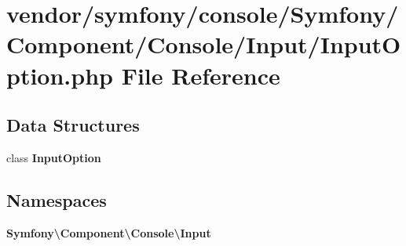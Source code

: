 \section{vendor/symfony/console/\+Symfony/\+Component/\+Console/\+Input/\+Input\+Option.php File Reference}
\label{_input_option_8php}
\subsection*{Data Structures}
\begin{DoxyCompactItemize}
\item 
class {\bf Input\+Option}
\end{DoxyCompactItemize}
\subsection*{Namespaces}
\begin{DoxyCompactItemize}
\item 
 {\bf Symfony\textbackslash{}\+Component\textbackslash{}\+Console\textbackslash{}\+Input}
\end{DoxyCompactItemize}

